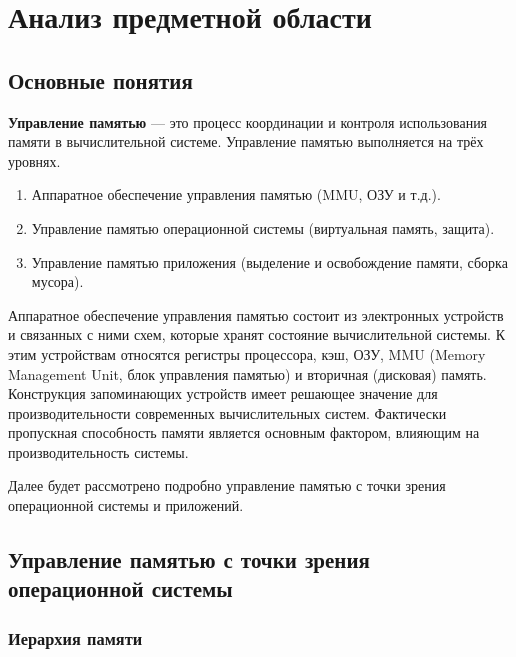 \chapter{Анализ предметной области}

\section{Основные понятия}

\textbf{Управление памятью} \cite{glossary} --- это процесс координации и контроля использования памяти в вычислительной системе. Управление памятью выполняется на трёх уровнях. 

\begin{enumerate}[label*=\arabic*)]
	\item Аппаратное обеспечение управления памятью (MMU, ОЗУ и т.д.).
	\item Управление памятью операционной системы (виртуальная память, защита).
	\item Управление памятью приложения (выделение и освобождение памяти, сборка мусора).
\end{enumerate}

Аппаратное обеспечение управления памятью состоит из электронных устройств и связанных с ними схем, которые хранят состояние вычислительной системы. К этим устройствам относятся регистры процессора, кэш, ОЗУ, MMU (Memory Management Unit, блок управления памятью) и вторичная (дисковая) память. Конструкция запоминающих устройств имеет решающее значение для производительности современных вычислительных систем. Фактически пропускная способность памяти является основным фактором, влияющим на производительность системы. \cite{glossary}

Далее будет рассмотрено подробно управление памятью с точки зрения операционной системы и приложений.



\section{Управление памятью с точки зрения операционной системы}

\subsection{Иерархия памяти}

